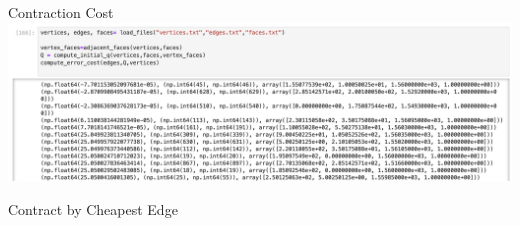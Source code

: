 \begin{frame}{Contraction Cost}
    \includegraphics[scale=.35]{images/heap.png}
    \begin{center}
        Contract by Cheapest Edge 
    \end{center}
\end{frame}

